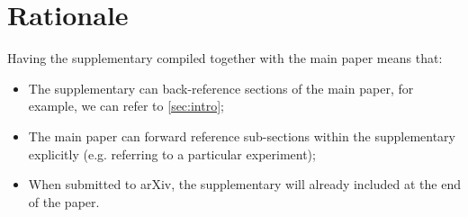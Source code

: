 \clearpage
\setcounter{page}{1}
\maketitlesupplementary


\section{Rationale}
\label{sec:rationale}
% 
Having the supplementary compiled together with the main paper means that:
% 
\begin{itemize}
\item The supplementary can back-reference sections of the main paper, for example, we can refer to \cref{sec:intro};
\item The main paper can forward reference sub-sections within the supplementary explicitly (e.g. referring to a particular experiment); 
\item When submitted to arXiv, the supplementary will already included at the end of the paper.
\end{itemize}

